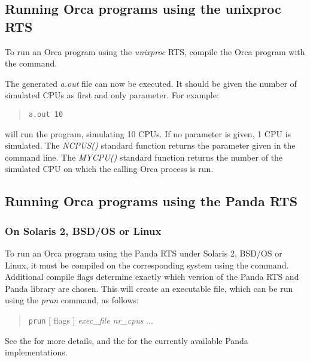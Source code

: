 \documentclass[10pt]{article}
\begin{document}
\subsection{Running Orca programs using the unixproc RTS}

To run an Orca program using the
{\em unixproc}
RTS, 
compile the Orca program with the
{}
{}
command.

The generated
{\em a.out}
file can now be executed.
It should be given the number of simulated CPUs as first and only parameter.
For example:
\begin{quote}
\begin{verbatim}
a.out 10
\end{verbatim}
\end{quote}
will run the program, simulating 10 CPUs.
If no parameter is given, 1 CPU is simulated.
The
{\em NCPUS()}
standard function returns
the parameter given in the command line.
The
{\em MYCPU()}
standard function returns the number of the simulated CPU on which the
calling Orca process is run.

\subsection{Running Orca programs using the Panda RTS}

\subsubsection{On Solaris 2, BSD/OS or Linux}

To run an Orca program using the Panda RTS under Solaris 2, BSD/OS or Linux, it
must be compiled on the corresponding system using the
{}
{}
command.
Additional compile flags determine exactly which version of the Panda RTS
and Panda library are chosen.
This will create an executable file, which can be run using the
{\em prun} command, as follows:
\begin{quote}
\verb+prun+ [ flags ] {\em exec\_file nr\_cpus} ...
\end{quote}
See the
{}
{}
for more details, and the
{}
{}
for the
currently available Panda implementations.
\end{document}
